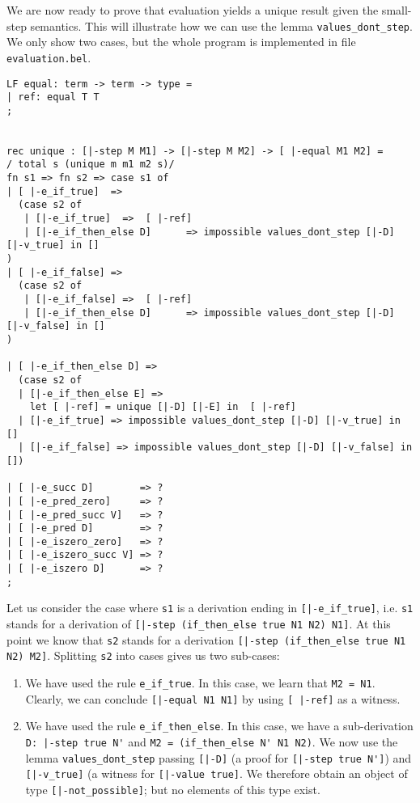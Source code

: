 We are now ready to prove that evaluation yields a unique result given the
small-step semantics. This will illustrate how we can use the lemma \lstinline!values_dont_step!. We only show two cases, but the whole program is
implemented in file \lstinline!evaluation.bel!.

\begin{lstlisting}
LF equal: term -> term -> type =
| ref: equal T T
;


rec unique : [|-step M M1] -> [|-step M M2] -> [ |-equal M1 M2] =
/ total s (unique m m1 m2 s)/
fn s1 => fn s2 => case s1 of
| [ |-e_if_true]  =>
  (case s2 of
   | [|-e_if_true]  =>  [ |-ref]
   | [|-e_if_then_else D]      => impossible values_dont_step [|-D] [|-v_true] in []
)
| [ |-e_if_false] =>
  (case s2 of
   | [|-e_if_false] =>  [ |-ref]
   | [|-e_if_then_else D]      => impossible values_dont_step [|-D] [|-v_false] in []
)

| [ |-e_if_then_else D] =>
  (case s2 of
  | [|-e_if_then_else E] =>
    let [ |-ref] = unique [|-D] [|-E] in  [ |-ref]
  | [|-e_if_true] => impossible values_dont_step [|-D] [|-v_true] in []
  | [|-e_if_false] => impossible values_dont_step [|-D] [|-v_false] in [])

| [ |-e_succ D]        => ?
| [ |-e_pred_zero]     => ?
| [ |-e_pred_succ V]   => ?
| [ |-e_pred D]        => ?
| [ |-e_iszero_zero]   => ?
| [ |-e_iszero_succ V] => ?
| [ |-e_iszero D]      => ?
;
\end{lstlisting}

Let us consider the case where \lstinline!s1! is a derivation ending in
\lstinline![|-e_if_true]!, i.e. \lstinline!s1! stands for a derivation of 
\lstinline![|-step (if_then_else true N1 N2) N1]!. At this point we know that \lstinline!s2! stands
for a derivation \lstinline![|-step (if_then_else true N1 N2) M2]!. Splitting
\lstinline!s2! into cases gives us two sub-cases:
\begin{enumerate}
\item We have used the rule
\lstinline!e_if_true!. In this case, we learn that
\lstinline!M2 = N1!. Clearly, we can conclude \lstinline![|-equal N1 N1]! by
using \lstinline![ |-ref]! as a witness.

\item We have used the rule \lstinline!e_if_then_else!. In this case, we have a
  sub-derivation \lstinline!D: |-step true N'! and \lstinline!M2 = (if_then_else N' N1 N2)!.
We now use the lemma \lstinline!values_dont_step! passing \lstinline![|-D]! (a
proof for \lstinline![|-step true N']!) and \lstinline![|-v_true]! (a witness
for \lstinline![|-value true]!.
We therefore obtain an object of type \lstinline![|-not_possible]!; but no
elements of this type exist.
\end{enumerate}


